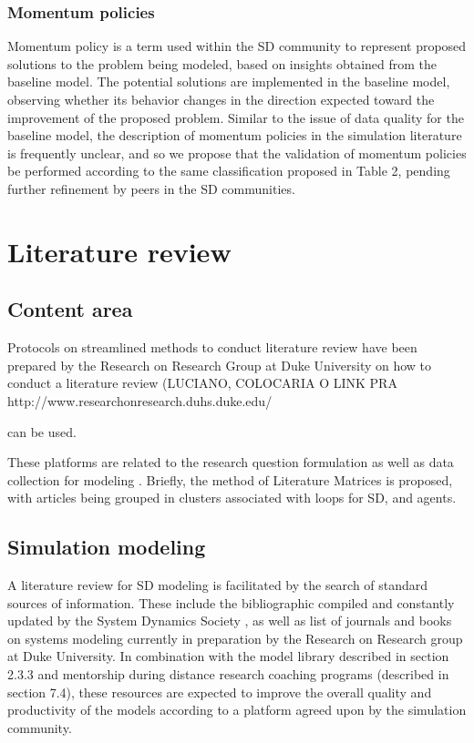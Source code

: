 \documentclass[11pt]{article}
\begin{document}
\subsubsection {Momentum policies}
Momentum policy \cite{PenaLyneis2009} is a term used within the SD community to represent proposed solutions to the problem being modeled, based on insights obtained from the baseline model.  The potential solutions are implemented in the baseline model, observing whether its behavior changes in the direction expected toward the improvement of the proposed problem.  Similar to the issue of data quality for the baseline model, the description of momentum policies in the simulation literature is frequently unclear, and so we propose that the validation of momentum policies be performed according to the same classification proposed in Table 2, pending further refinement by peers in the SD communities.

\section {Literature review}

\subsection {Content area}
Protocols on streamlined methods to conduct literature review have been prepared by the Research on Research Group at Duke University on how to conduct a literature review (LUCIANO, COLOCARIA O LINK PRA http://www.researchonresearch.duhs.duke.edu/ 

can be used.

  These platforms are related to the research question formulation as well as data collection for modeling \cite{researchonresearch113}.  Briefly, the method of Literature Matrices \cite{PiETROBON2004} is proposed, with articles being grouped in clusters associated with loops for SD, and agents.  

\subsection {Simulation modeling}
A literature review for  SD modeling is facilitated by the search of standard sources of information.  These include the bibliographic compiled and constantly updated by the System Dynamics Society \cite{systemdynamics-biblio}, as well as list of journals and books on systems modeling currently in preparation by the Research on Research group at Duke University.  In combination with the model library described in section 2.3.3 and mentorship during distance research coaching programs (described in section 7.4), these resources are expected to improve the overall quality and productivity of the models according to a platform agreed upon by the simulation community.
\end{document}
